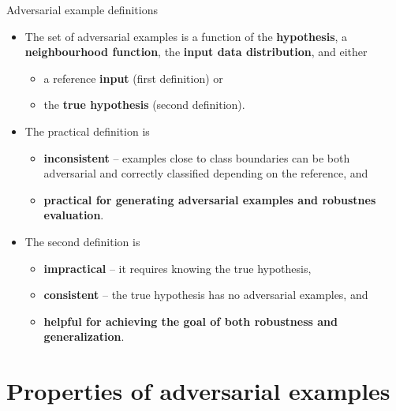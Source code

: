 \documentclass{beamer}
\begin{document}
\begin{frame}[allowframebreaks=0.9]{Adversarial example definitions}
	\begin{itemize}
	\item The set of adversarial examples is a function of the \textbf{hypothesis}, a \textbf{neighbourhood function}, the \textbf{input data distribution}, and either
	\begin{itemize}
		\item a reference \textbf{input} (first definition) or
		\item the \textbf{true hypothesis} (second definition).
	\end{itemize}
	\item The practical definition is
	\begin{itemize}
		\item \textbf{inconsistent} -- examples close to class boundaries can be both adversarial and correctly classified depending on the reference, and 
		\item \textbf{practical for generating adversarial examples and robustnes evaluation}.
	\end{itemize}
	\item The second definition is 
	\begin{itemize}
		\item \textbf{impractical} -- it requires knowing the true hypothesis,
		\item \textbf{consistent} -- the true hypothesis has no adversarial examples, and 
		\item \textbf{helpful for achieving the goal of both robustness and generalization}.
	\end{itemize}
\end{itemize}
\end{frame}

\section{Properties of adversarial examples}
\end{document}
